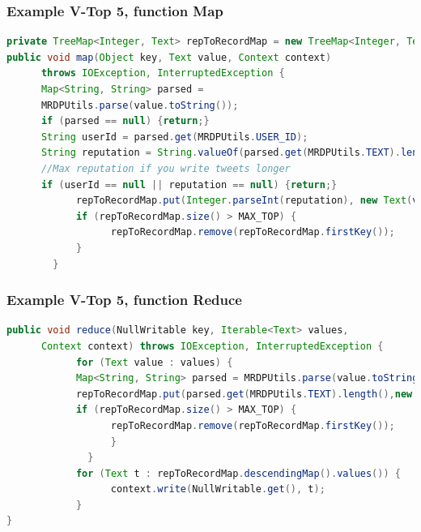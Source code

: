 \documentclass[xcolor=dvipsnames,dvip,notes=show,table]{beamer}
\begin{document}



\begin{frame}[fragile]
  \frametitle{Example V-Top 5, function Map}

\begin{lstlisting}[language=Java]
private TreeMap<Integer, Text> repToRecordMap = new TreeMap<Integer, Text>();
public void map(Object key, Text value, Context context)
      throws IOException, InterruptedException {
      Map<String, String> parsed = 
      MRDPUtils.parse(value.toString());
      if (parsed == null) {return;}
      String userId = parsed.get(MRDPUtils.USER_ID);
      String reputation = String.valueOf(parsed.get(MRDPUtils.TEXT).length()); 
      //Max reputation if you write tweets longer
      if (userId == null || reputation == null) {return;}
            repToRecordMap.put(Integer.parseInt(reputation), new Text(value));
            if (repToRecordMap.size() > MAX_TOP) {
                  repToRecordMap.remove(repToRecordMap.firstKey());
            }
        }
\end{lstlisting}

\end{frame}

\begin{frame}[fragile]
  \frametitle{Example V-Top 5, function Reduce}

\begin{lstlisting}[language=Java]
public void reduce(NullWritable key, Iterable<Text> values,
      Context context) throws IOException, InterruptedException {
            for (Text value : values) {
            Map<String, String> parsed = MRDPUtils.parse(value.toString());
            repToRecordMap.put(parsed.get(MRDPUtils.TEXT).length(),new Text(value));
            if (repToRecordMap.size() > MAX_TOP) {
                  repToRecordMap.remove(repToRecordMap.firstKey());
                  }
              }
            for (Text t : repToRecordMap.descendingMap().values()) {
                  context.write(NullWritable.get(), t);
            }
}
\end{lstlisting}

\end{frame}
\end{document}
